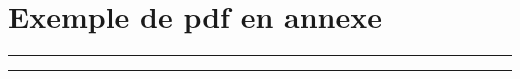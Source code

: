 
\renewcommand\chaptername{Annexe~}

\lhead[\fancyplain{}{\leftmark}]%
      {\fancyplain{}{}} %
\chead[\fancyplain{}{}]%
      {\fancyplain{}{}}
\rhead[\fancyplain{}{}]%
      {\fancyplain{}{\rightmark}}%
\lfoot[\fancyplain{}{}]%
      {\fancyplain{}{}}
\cfoot[\fancyplain{}{\thepage}]%
      {\fancyplain{}{\thepage}} %
\rfoot[\fancyplain{}{}]%
     {\fancyplain{}{\scriptsize}}

\chapter{Exemple de pdf en annexe}
\label{appendix/THMT_article}


\begin{center}
\rule{0.8\linewidth}{.5pt}
\begin{minipage}{0.8\linewidth}
\smallskip

\textit{\lipsum[1]}

\end{minipage}
\smallskip
\rule{0.8\linewidth}{.5pt}
\end{center}

